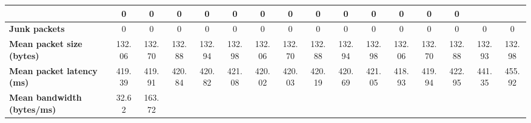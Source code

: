 \begin{table}[!h]
{\begin{tabular}{|l|ccccc|ccccc|ccccc|}
            & \multicolumn{1}{c|}{0}
            & \multicolumn{1}{c|}{0}
            & \multicolumn{1}{c|}{0}
            & \multicolumn{1}{c|}{0}
            & \multicolumn{1}{c|}{0}
            & \multicolumn{1}{c|}{0}
            & \multicolumn{1}{c|}{0}
            & \multicolumn{1}{c|}{0}
            & \multicolumn{1}{c|}{0}
            & \multicolumn{1}{c|}{0}
            & \multicolumn{1}{c|}{0}
            & \multicolumn{1}{c|}{0}
            & \multicolumn{1}{c|}{0}
            \\ \hline
            \textbf{Junk packets} & \multicolumn{1}{c|}{0} & \multicolumn{1}{c|}{0} &
            \multicolumn{1}{c|}{0}
            & \multicolumn{1}{c|}{0}
            & \multicolumn{1}{c|}{0}
            & \multicolumn{1}{c|}{0}
            & \multicolumn{1}{c|}{0}
            & \multicolumn{1}{c|}{0}
            & \multicolumn{1}{c|}{0}
            & \multicolumn{1}{c|}{0}
            & \multicolumn{1}{c|}{0}
            & \multicolumn{1}{c|}{0}
            & \multicolumn{1}{c|}{0}
            & \multicolumn{1}{c|}{0}
            & \multicolumn{1}{c|}{0}
            \\ \hline
            \textbf{Mean packet size (bytes)} & \multicolumn{1}{c|}{132.06} & \multicolumn{1}{c|}{132.70}
            & \multicolumn{1}{c|}{132.88}
            & \multicolumn{1}{c|}{132.94}
            & \multicolumn{1}{c|}{132.98}
            & \multicolumn{1}{c|}{132.06}
            & \multicolumn{1}{c|}{132.70}
            & \multicolumn{1}{c|}{132.88}
            & \multicolumn{1}{c|}{132.94}
            & \multicolumn{1}{c|}{132.98}
            & \multicolumn{1}{c|}{132.06}
            & \multicolumn{1}{c|}{132.70}
            & \multicolumn{1}{c|}{132.88}
            & \multicolumn{1}{c|}{132.93}
            & \multicolumn{1}{c|}{132.98}
            \\ \hline
            \textbf{Mean packet latency (ms)} & \multicolumn{1}{c|}{419.39} & \multicolumn{1}{c|}{419.91}
            & \multicolumn{1}{c|}{420.84}
            & \multicolumn{1}{c|}{420.82}
            & \multicolumn{1}{c|}{421.08}
            & \multicolumn{1}{c|}{420.02}
            & \multicolumn{1}{c|}{420.03}
            & \multicolumn{1}{c|}{420.19}
            & \multicolumn{1}{c|}{420.69}
            & \multicolumn{1}{c|}{421.05}
            & \multicolumn{1}{c|}{418.93}
            & \multicolumn{1}{c|}{419.94}
            & \multicolumn{1}{c|}{422.95}
            & \multicolumn{1}{c|}{441.35}
            & \multicolumn{1}{c|}{455.92}
            \\ \hline
            \textbf{Mean bandwidth (bytes/ms)} & \multicolumn{1}{c|}{32.62} & \multicolumn{1}{c|}{163.72}

\end{tabular}}
\end{table}
